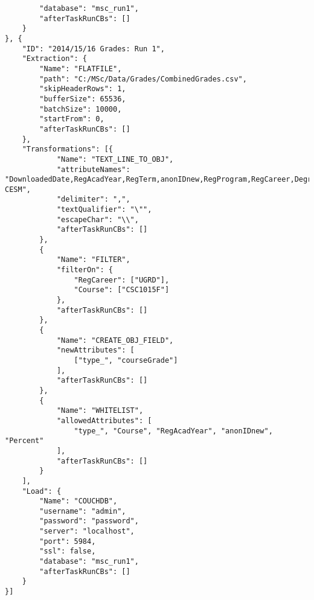 \begin{verbatim}
        "database": "msc_run1",
        "afterTaskRunCBs": []
    }
}, {
    "ID": "2014/15/16 Grades: Run 1",
    "Extraction": {
        "Name": "FLATFILE",
        "path": "C:/MSc/Data/Grades/CombinedGrades.csv",
        "skipHeaderRows": 1,
        "bufferSize": 65536,
        "batchSize": 10000,
        "startFrom": 0,
        "afterTaskRunCBs": []
    },
    "Transformations": [{
            "Name": "TEXT_LINE_TO_OBJ",
            "attributeNames": "DownloadedDate,RegAcadYear,RegTerm,anonIDnew,RegProgram,RegCareer,Degree,DegreeDescr,Subject,Catalog.,Course,CourseSuffix,Session,Percent,Symbol,UnitsTaken,CourseID,CourseDescr,CourseCareer,Faculty,Dept,MaximumCrseUnits,CourseCount,CourseLevel,CESM,Sub-CESM",
            "delimiter": ",",
            "textQualifier": "\"",
            "escapeChar": "\\",
            "afterTaskRunCBs": []
        },
        {
            "Name": "FILTER",
            "filterOn": {
                "RegCareer": ["UGRD"],
                "Course": ["CSC1015F"]
            },
            "afterTaskRunCBs": []
        },
        {
            "Name": "CREATE_OBJ_FIELD",
            "newAttributes": [
                ["type_", "courseGrade"]
            ],
            "afterTaskRunCBs": []
        },
        {
            "Name": "WHITELIST",
            "allowedAttributes": [
                "type_", "Course", "RegAcadYear", "anonIDnew", "Percent"
            ],
            "afterTaskRunCBs": []
        }
    ],
    "Load": {
        "Name": "COUCHDB",
        "username": "admin",
        "password": "password",
        "server": "localhost",
        "port": 5984,
        "ssl": false,
        "database": "msc_run1",
        "afterTaskRunCBs": []
    }
}]
\end{verbatim}

